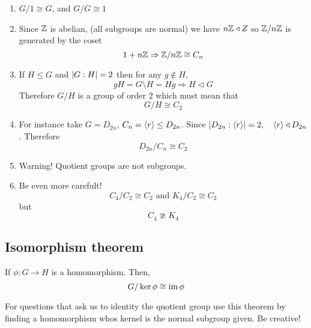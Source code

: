 \documentclass{article}
\begin{document}
\begin{eg}\leavevmode
    \begin{enumerate}
        \item $G / 1 \cong G$, and $G / G \cong 1$
        \item Since $\mathbb{Z}$ is abelian, (all subgroups are normal) we have $n\mathbb{Z} \triangleleft Z$ so $\mathbb{Z} / n\mathbb{Z}$ is generated by the coset
        \[ 1 + n\mathbb{Z} \Rightarrow \mathbb{Z} / n\mathbb{Z} \cong C_n \]
        \item If $H \leq G$ and $\left\lvert G : H\right\rvert = 2$ then for any $g \notin H$,
        \[ gH = G \setminus H = Hg \Rightarrow H \triangleleft G \]
        Therefore $G / H$ is a group of order $2$ which must mean that
        \[ G / H \cong C_2 \]
        \item For instance take $G = D_{2n}$, $C_n = \left\langle r\right\rangle \leq D_{2n}$.
        Since $\left\lvert D_{2n}: \left\langle r\right\rangle\right\rvert = 2, \quad \left\langle r\right\rangle \triangleleft D_{2n}$. Therefore
        \[ D_{2n} / C_n \cong C_2 \]
        \item Warning! Quotient groups are not subgroups.
        \item Be even more carefult! 
        \[
            C_4 / C_2 \cong C_2 \text{ and } K_4 / C_2 \cong C_2 
        \]
        but
        \[
            C_4 \ncong K_4  
        \]
    \end{enumerate}
\end{eg}

\subsection{Isomorphism theorem}
\begin{thm}
    If $\phi: G \rightarrow H$ is a homomorphism. Then,
    \[
        G / \ker \phi \cong \operatorname{im} \phi  
    \]
\end{thm}
\begin{remark}
    For questions that ask us to identity the quotient group use this theorem by finding a homomorphism whos kernel is the normal subgroup given. Be creative!
\end{remark}
\end{document}
